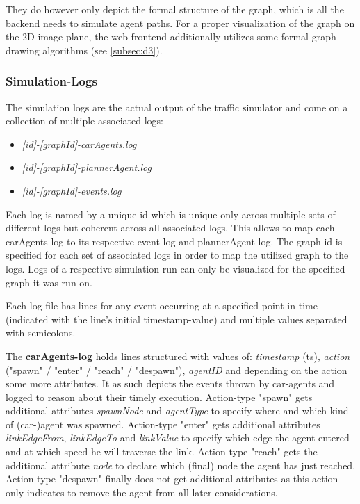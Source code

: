 They do however only depict the formal structure of the graph, which is all the backend needs to simulate agent paths. For a proper visualization of the graph on the 2D image plane, the web-frontend additionally utilizes some formal graph-drawing algorithms (see \autoref{subsec:d3}).


\subsubsection{Simulation-Logs}

The simulation logs are the actual output of the traffic simulator and come on a collection of multiple associated logs: 

\begin{itemize}
    \item \textit{[id]-[graphId]-carAgents.log}
    \item \textit{[id]-[graphId]-plannerAgent.log}
    \item \textit{[id]-[graphId]-events.log}
\end{itemize}

Each log is named by a unique id which is unique only across multiple sets of different logs but coherent across all associated logs. This allows to map each carAgents-log to its respective event-log and plannerAgent-log.
The graph-id is specified for each set of associated logs in order to map the utilized graph to the logs. Logs of a respective simulation run can only be visualized for the specified graph it was run on.

Each log-file has lines for any event occurring at a specified point in time (indicated with the line's initial timestamp-value) and multiple values separated with semicolons.

The \textbf{carAgents-log} holds lines structured with values of: \textit{timestamp} (ts), \textit{action} ("spawn" / "enter" / "reach" / "despawn"), \textit{agentID} and depending on the action some more attributes. It as such depicts the events thrown by car-agents and logged to reason about their timely execution.
Action-type "spawn" gets additional attributes \textit{spawnNode} and \textit{agentType} to specify where and which kind of (car-)agent was spawned. 
Action-type "enter" gets additional attributes \textit{linkEdgeFrom}, \textit{linkEdgeTo} and \textit{linkValue} to specify which edge the agent entered and at which speed he will traverse the link.
Action-type "reach" gets the additional attribute \textit{node} to declare which (final) node the agent has just reached.
Action-type "despawn" finally does not get additional attributes as this action only indicates to remove the agent from all later considerations.

